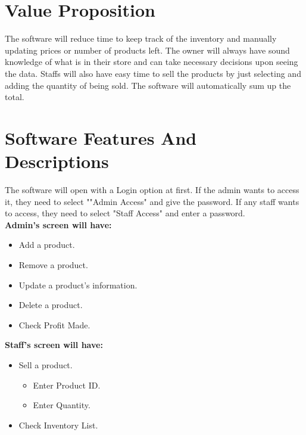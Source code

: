 \documentclass{article}
\begin{document}
\section*{\LARGE Value Proposition}
\large The software will reduce time to keep track of the inventory and manually updating prices or number of products left. The owner will always have sound knowledge of what is in their store and can take necessary decisions upon seeing the data. Staffs will also have easy time to sell the products by just selecting and adding the quantity of being sold. The software will automatically sum up the total.

\pagebreak

\section*{\LARGE Software Features And Descriptions}
The software will open with a Login option at first. If the admin wants to access it, they need to select ""Admin Access" and give the password. If any staff wants to access, they need to select "Staff Access" and enter a password. \\

\textbf {\Large Admin's screen will have:}
\begin{itemize}
    \item \large Add a product.
    \item \large Remove a product.
    \item \large Update a product's information.
    \item \large Delete a product.
    \item \large Check Profit Made.  \\
\end{itemize} 

\textbf {\Large Staff's screen will have:}
\begin{itemize}
    \item \large Sell a product.
    \begin{itemize}
    \item \large Enter Product ID.
    \item \large Enter Quantity.
    \end{itemize}
    \item \large Check Inventory List.  \\
\end{itemize} 
\end{document}
